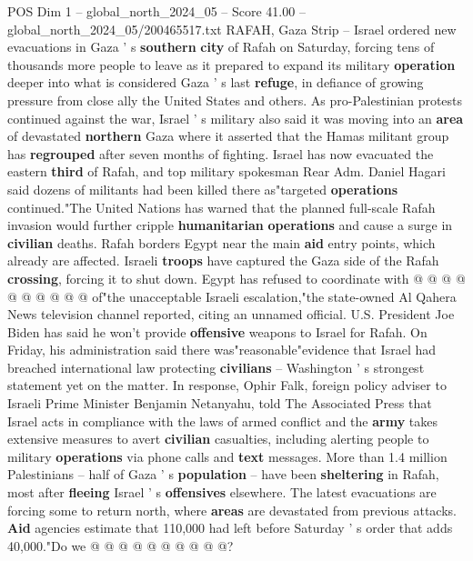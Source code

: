 \begin{textsample}{POS Dim 1 – global\_north\_2024\_05 – Score 41.00 – global\_north\_2024\_05/200465517.txt}  \label{ex:f1_pos_278}
RAFAH, Gaza Strip -- Israel ordered new evacuations in Gaza ' s \textbf{southern} \textbf{city} of Rafah on Saturday, forcing tens of thousands more people to leave as it prepared to expand its military \textbf{operation} deeper into what is considered Gaza ' s last \textbf{refuge}, in defiance of growing pressure from close ally the United States and others.
As pro-Palestinian protests continued against the war, Israel ' s military also said it was moving into an \textbf{area} of devastated \textbf{northern} Gaza where it asserted that the Hamas militant group has \textbf{regrouped} after seven months of fighting.
Israel has now evacuated the eastern \textbf{third} of Rafah, and top military spokesman Rear Adm.
Daniel Hagari said dozens of militants had been killed there as"targeted \textbf{operations} continued."The United Nations has warned that the planned full-scale Rafah invasion would further cripple \textbf{humanitarian} \textbf{operations} and cause a surge in \textbf{civilian} deaths.
Rafah borders Egypt near the main \textbf{aid} entry points, which already are affected.
Israeli \textbf{troops} have captured the Gaza side of the Rafah \textbf{crossing}, forcing it to shut down.
Egypt has refused to coordinate with @ @ @ @ @ @ @ @ @ @ of"the unacceptable Israeli escalation,"the state-owned Al Qahera News television channel reported, citing an unnamed official.
U.S.
President Joe Biden has said he won't provide \textbf{offensive} weapons to Israel for Rafah.
On Friday, his administration said there was"reasonable"evidence that Israel had breached international law protecting \textbf{civilians} -- Washington ' s strongest statement yet on the matter.
In response, Ophir Falk, foreign policy adviser to Israeli Prime Minister Benjamin Netanyahu, told The Associated Press that Israel acts in compliance with the laws of armed conflict and the \textbf{army} takes extensive measures to avert \textbf{civilian} casualties, including alerting people to military \textbf{operations} via phone calls and \textbf{text} messages.
More than 1.4 million Palestinians -- half of Gaza ' s \textbf{population} -- have been \textbf{sheltering} in Rafah, most after \textbf{fleeing} Israel ' s \textbf{offensives} elsewhere.
The latest evacuations are forcing some to return north, where \textbf{areas} are devastated from previous attacks. \textbf{Aid} agencies estimate that 110,000 had left before Saturday ' s order that adds 40,000."Do we @ @ @ @ @ @ @ @ @ @?

\end{textsample}
